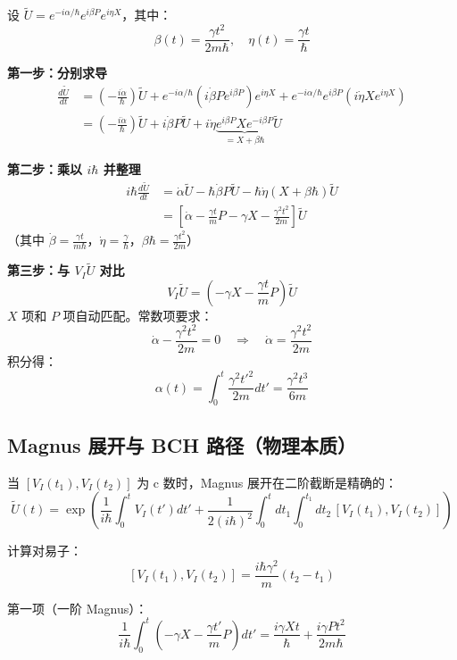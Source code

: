 设 $\tilde{U} = e^{-i\alpha/\hbar} e^{i\beta P} e^{i\eta X}$，其中：
\[
\beta(t) = \frac{\gamma t^2}{2m\hbar}, \quad \eta(t) = \frac{\gamma t}{\hbar}
\]

\textbf{第一步：分别求导}
\begin{align*}
\frac{d\tilde{U}}{dt} &= \left( -\frac{i\dot{\alpha}}{\hbar} \right) \tilde{U} + e^{-i\alpha/\hbar} \left( i\dot{\beta} P e^{i\beta P} \right) e^{i\eta X} + e^{-i\alpha/\hbar} e^{i\beta P} \left( i\dot{\eta} X e^{i\eta X} \right) \\
&= \left( -\frac{i\dot{\alpha}}{\hbar} \right) \tilde{U} + i\dot{\beta} P \tilde{U} + i\dot{\eta} \underbrace{e^{i\beta P} X e^{-i\beta P}}_{= X + \beta\hbar} \tilde{U}
\end{align*}

\textbf{第二步：乘以 $i\hbar$ 并整理}
\begin{align*}
i\hbar \frac{d\tilde{U}}{dt} &= \dot{\alpha} \tilde{U} - \hbar\dot{\beta} P \tilde{U} - \hbar\dot{\eta}(X + \beta\hbar) \tilde{U} \\
&= \left[ \dot{\alpha} - \frac{\gamma t}{m} P - \gamma X - \frac{\gamma^2 t^2}{2m} \right] \tilde{U}
\end{align*}
（其中 $\dot{\beta} = \frac{\gamma t}{m\hbar}$，$\dot{\eta} = \frac{\gamma}{\hbar}$，$\beta\hbar = \frac{\gamma t^2}{2m}$）

\textbf{第三步：与 $V_I \tilde{U}$ 对比}
\[
V_I \tilde{U} = \left( -\gamma X - \frac{\gamma t}{m} P \right) \tilde{U}
\]
$X$ 项和 $P$ 项自动匹配。常数项要求：
\[
\dot{\alpha} - \frac{\gamma^2 t^2}{2m} = 0 \quad \Rightarrow \quad \dot{\alpha} = \frac{\gamma^2 t^2}{2m}
\]
积分得：
\[
\alpha(t) = \int_0^t \frac{\gamma^2 t'^2}{2m} dt' = \frac{\gamma^2 t^3}{6m}
\]

\subsection{Magnus 展开与 BCH 路径（物理本质）}

当 $[V_I(t_1), V_I(t_2)]$ 为 c 数时，Magnus 展开在二阶截断是精确的：
\[
\tilde{U}(t) = \exp\left( \frac{1}{i\hbar} \int_0^t V_I(t') dt' + \frac{1}{2(i\hbar)^2} \int_0^t dt_1 \int_0^{t_1} dt_2 \, [V_I(t_1), V_I(t_2)] \right)
\]

计算对易子：
\[
[V_I(t_1), V_I(t_2)] = \frac{i\hbar\gamma^2}{m}(t_2 - t_1)
\]

第一项（一阶 Magnus）：
\[
\frac{1}{i\hbar} \int_0^t \left( -\gamma X - \frac{\gamma t'}{m} P \right) dt' = \frac{i\gamma X t}{\hbar} + \frac{i\gamma P t^2}{2m\hbar}
\]

